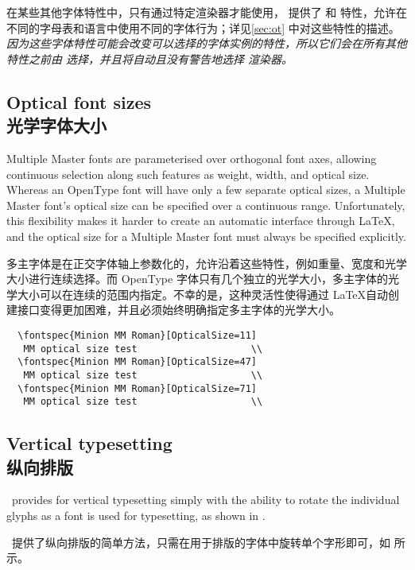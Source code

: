 \documentclass[a4paper]{l3doc}
\begin{document}
在某些其他字体特性中，只有通过特定渲染器才能使用， 提供了  和  特性，允许在不同的字母表和语言中使用不同的字体行为；详见\vref{sec:ot} 中对这些特性的描述。{\em 因为这些字体特性可能会改变可以选择的字体实例的特性，所以它们会在所有其他特性之前由  选择，并且将自动且没有警告地选择  渲染器。}


\subsection{Optical font sizes\\光学字体大小} \label{sec:aat-opticalsize}

Multiple Master fonts are parameterised over
orthogonal font axes, allowing continuous selection along such
features as weight, width, and optical size.
Whereas an OpenType font will have only a few separate
optical sizes, a Multiple Master font's optical size can be
specified over a continuous range. Unfortunately, this flexibility makes
it harder to create an automatic interface through \LaTeX, and the
optical size for a Multiple Master font must always be specified
explicitly.

多主字体是在正交字体轴上参数化的，允许沿着这些特性，例如重量、宽度和光学大小进行连续选择。而 OpenType 字体只有几个独立的光学大小，多主字体的光学大小可以在连续的范围内指定。不幸的是，这种灵活性使得通过 \LaTeX 自动创建接口变得更加困难，并且必须始终明确指定多主字体的光学大小。
\begin{Verbatim}
  \fontspec{Minion MM Roman}[OpticalSize=11]
   MM optical size test                    \\
  \fontspec{Minion MM Roman}[OpticalSize=47]
   MM optical size test                    \\
  \fontspec{Minion MM Roman}[OpticalSize=71]
   MM optical size test                    \\
\end{Verbatim}


\subsection{Vertical typesetting\\纵向排版}

\XeTeX\ provides for vertical typesetting simply with the ability to rotate
the individual glyphs as a font is used for typesetting, as shown in
.

\XeTeX\ 提供了纵向排版的简单方法，只需在用于排版的字体中旋转单个字形即可，如  所示。
\end{document}
